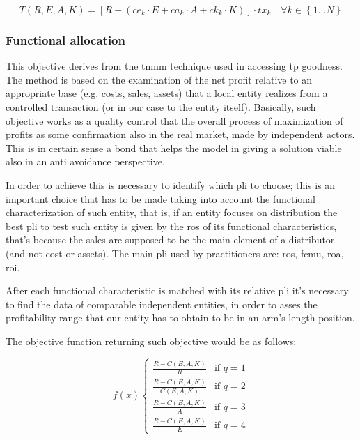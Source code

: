 \begin{doublespace}
\begin{equation}
T(R,E,A,K)= [R-(ce_k\cdot E+ca_k\cdot A+ck_k\cdot K)]\cdot tx_k \quad \forall k \in \left\{1...N\right\}
\end{equation}

\subsubsection{Functional allocation}
This objective derives from the \gls{tnmm} technique used in accessing \gls{tp} goodness. The method is based on the examination of the net profit relative to an appropriate base (e.g. costs, sales, assets) that a local entity realizes from a controlled transaction (or in our case to the entity itself). Basically, such objective works as a quality control that the overall process of maximization of profits as some confirmation also in the real market, made by independent actors. This is in certain sense a bond that helps the model in giving a solution viable also in an anti avoidance perspective.

In order to achieve this is necessary to identify which \gls{pli} to choose; this is an important choice that has to be made taking into account the functional characterization of such entity, that is, if an entity focuses on distribution the best \gls{pli} to test such entity is given by the \gls{ros} of its functional characteristics, that's because the sales are supposed to be the main element of a distributor (and not cost or assets). The main \gls{pli} used by practitioners are: \gls{ros}, \gls{fcmu}, \gls{roa}, \gls{roi}.

After each functional characteristic is matched with its relative \gls{pli} it's necessary to find the data of comparable independent entities, in order to asses the profitability range that our entity has to obtain to be in an arm's length position.

The objective function returning such objective would be as follows:

\begin{equation}
f(x) 
\begin{cases}
   \frac{R - C(E,A,K)}{R} & \text{if } q=1
   \\
   \frac{R - C(E,A,K)}{C(E,A,K)} & \text{if } q=2
   \\
   \frac{R - C(E,A,K)}{A} & \text{if } q=3
   \\
   \frac{R - C(E,A,K)}{E} & \text{if } q=4
\end{cases}
\end{equation}


\end{doublespace}
